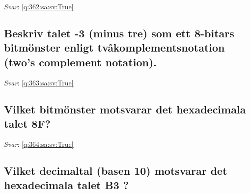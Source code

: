 \documentclass[a4paper,11pt,oneside]{article}
\begin{document}
\begin{sloppypar}
\label{q:362:sa:sv:False}

\vspace{2cm}

\noindent\makebox[\textwidth]{\hrulefill}

\vspace{1cm}

\textit{Svar}: \autoref{q:362:sa:sv:True}



\subsection{Beskriv talet -3 (minus tre) som ett 8-bitars bitm\"onster enligt tv\r{a}komplementsnotation (two{\textquoteright}s complement notation).}

\label{q:363:sa:sv:False}

\vspace{2cm}

\noindent\makebox[\textwidth]{\hrulefill}

\vspace{1cm}

\textit{Svar}: \autoref{q:363:sa:sv:True}



\subsection{Vilket bitm\"onster motsvarar det hexadecimala talet 8F?}

\label{q:364:sa:sv:False}

\vspace{2cm}

\noindent\makebox[\textwidth]{\hrulefill}

\vspace{1cm}

\textit{Svar}: \autoref{q:364:sa:sv:True}



\subsection{Vilket decimaltal (basen 10) motsvarar det hexadecimala talet B3 ?}

\label{q:365:sa:sv:False}

\vspace{2cm}

\noindent\makebox[\textwidth]{\hrulefill}

\vspace{1cm}


\end{sloppypar}
\end{document}
